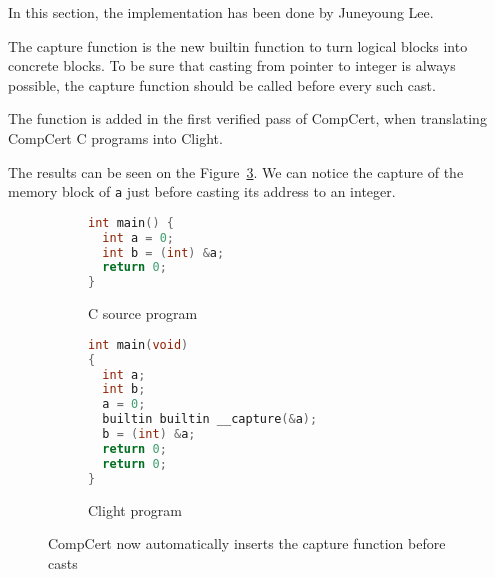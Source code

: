 \label{sec:capturesem}

In this section, the implementation has been done by Juneyoung Lee.

The capture function is the new builtin function to turn logical blocks into concrete blocks.
To be sure that casting from pointer to integer is always possible, the capture function should be called before every such cast.

The function is added in the first verified pass of CompCert, when translating CompCert C programs into Clight.

The results can be seen on the Figure~\ref{fig:captureexample}. We can notice the capture of the memory block of \texttt{a} just before casting its address to an integer.

\begin{figure}[H]
\begin{subfigure}{.48\textwidth}
  \begin{lstlisting}[language=C]
int main() {
  int a = 0;
  int b = (int) &a;
  return 0;
}
  \end{lstlisting}
  \caption{C source program}
  \label{fig:capturec}
\end{subfigure}
\begin{subfigure}{.48\textwidth}
  \begin{lstlisting}[language=C]
int main(void)
{
  int a;
  int b;
  a = 0;
  builtin builtin __capture(&a);
  b = (int) &a;
  return 0;
  return 0;
}
  \end{lstlisting}
  \caption{Clight program}
  \label{fig:captureclight}
\end{subfigure}
\caption{CompCert now automatically inserts the capture function before casts}
\label{fig:captureexample}
\end{figure}
